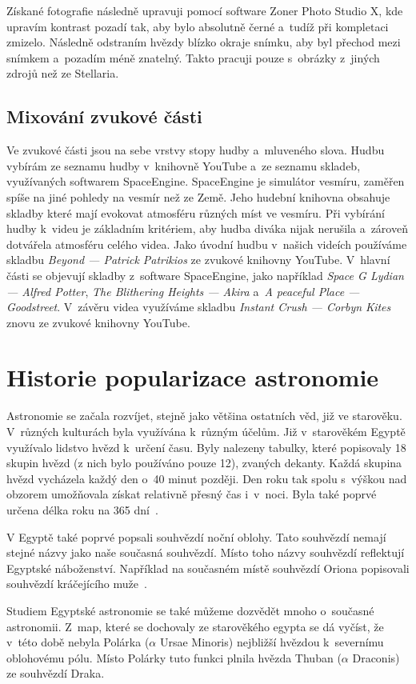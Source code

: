 \documentclass[12pt,a4paper,titlepage]{article}
\begin{document}
Získané fotografie následně upravuji pomocí software Zoner Photo Studio X, kde upravím kontrast pozadí tak, aby bylo absolutně černé a~tudíž při kompletaci zmizelo. Následně odstraním hvězdy blízko okraje snímku, aby byl přechod mezi snímkem a~pozadím méně znatelný. Takto pracuji pouze s~obrázky z~jiných zdrojů než ze Stellaria.
\subsection{Mixování zvukové části}
Ve zvukové části jsou na sebe vrstvy stopy hudby a~mluveného slova. Hudbu vybírám ze seznamu hudby v~knihovně YouTube a~ze seznamu skladeb, využívaných softwarem SpaceEngine. SpaceEngine je simulátor vesmíru, zaměřen spíše na jiné pohledy na vesmír než ze Země. Jeho hudební knihovna obsahuje skladby které mají evokovat atmosféru různých míst ve vesmíru. Při vybírání hudby k~videu je základním kritériem, aby hudba diváka nijak nerušila a~zároveň dotvářela atmosféru celého videa. Jako úvodní hudbu v~našich videích používáme skladbu \textit{Beyond --- Patrick Patrikios} ze zvukové knihovny YouTube. V~hlavní části se objevují skladby z~software SpaceEngine, jako například \textit{Space G Lydian --- Alfred Potter}, \textit{The Blithering Heights --- Akira} a~\textit{A peaceful Place --- Goodstreet}. V~závěru videa využíváme skladbu \textit{Instant Crush --- Corbyn Kites} znovu ze zvukové knihovny YouTube.
\section{Historie popularizace astronomie}
Astronomie se začala rozvíjet, stejně jako většina ostatních věd, již ve starověku. V~různých kulturách byla využívána k~různým účelům. Již v~starověkém Egyptě využívalo lidstvo hvězd k~určení času. Byly nalezeny tabulky, které popisovaly 18 skupin hvězd (z nich bylo používáno pouze 12), zvaných dekanty. Každá skupina hvězd vycházela každý den o~40 minut později. Den roku tak spolu s~výškou nad obzorem umožňovala získat relativně přesný čas i~v~noci. Byla také poprvé určena délka roku na 365 dní~. 

V Egyptě také poprvé popsali souhvězdí noční oblohy. Tato souhvězdí nemají stejné názvy jako naše současná souhvězdí. Místo toho názvy souhvězdí reflektují Egyptské náboženství. Například na současném místě souhvězdí Oriona popisovali souhvězdí kráčejícího muže~.

Studiem Egyptské astronomie se také můžeme dozvědět mnoho o~současné astronomii. Z~map, které se dochovaly ze starověkého egypta se dá vyčíst, že v~této době nebyla Polárka ($\alpha$ Ursae Minoris) nejbližší hvězdou k~severnímu oblohovému pólu. Místo Polárky tuto funkci plnila hvězda Thuban ($\alpha$ Draconis) ze souhvězdí Draka. 
\end{document}

